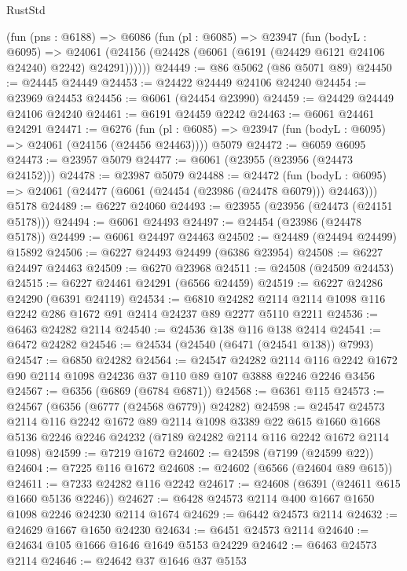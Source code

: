 \begin{lexlean}{RustStd}
\begin{coremodule}
    (fun (pns : @6188) =>
    @6086
      (fun (pl : @6085) =>
      @23947
        (fun (bodyL : @6095) =>
        @24061 (@24156 (@24428 (@6061 (@6191 (@24429 @6121 @24106 @24240) @2242) @24291))))))
@24449 := @86 @5062 (@86 @5071 @89)
@24450 := @24445 @24449
@24453 := @24422 @24449 @24106 @24240
@24454 := @23969 @24453
@24456 := @6061 (@24454 @23990)
@24459 := @24429 @24449 @24106 @24240
@24461 := @6191 @24459 @2242
@24463 := @6061 @24461 @24291
@24471 := @6276
    (fun (pl : @6085) => @23947 (fun (bodyL : @6095) => @24061 (@24156 (@24456 @24463))))
    @5079
@24472 := @6059 @6095
@24473 := @23957 @5079
@24477 := @6061 (@23955 (@23956 (@24473 @24152)))
@24478 := @23987 @5079
@24488 := @24472
    (fun (bodyL : @6095) => @24061 (@24477 (@6061 (@24454 (@23986 (@24478 @6079))) @24463)))
    @5178
@24489 := @6227 @24060
@24493 := @23955 (@23956 (@24473 (@24151 @5178)))
@24494 := @6061 @24493
@24497 := @24454 (@23986 (@24478 @5178))
@24499 := @6061 @24497 @24463
@24502 := @24489 (@24494 @24499) @15892
@24506 := @6227 @24493 @24499 (@6386 @23954)
@24508 := @6227 @24497 @24463
@24509 := @6270 @23968
@24511 := @24508 (@24509 @24453)
@24515 := @6227 @24461 @24291 (@6566 @24459)
@24519 := @6227 @24286 @24290 (@6391 @24119)
@24534 := @6810
    @24282
    @2114
    @2114
    @1098
    @116
    @2242
    @286
    @1672
    @91
    @2414
    @24237
    @89
    @2277
    @5110
    @2211
@24536 := @6463 @24282 @2114
@24540 := @24536 @138 @116 @138 @2414
@24541 := @6472 @24282
@24546 := @24534 (@24540 (@6471 (@24541 @138)) @7993)
@24547 := @6850 @24282
@24564 := @24547
    @24282
    @2114
    @116
    @2242
    @1672
    @90
    @2114
    @1098
    @24236
    @37
    @110
    @89
    @107
    @3888
    @2246
    @2246
    @3456
@24567 := @6356 (@6869 (@6784 @6871))
@24568 := @6361 @115
@24573 := @24567 (@6356 (@6777 (@24568 @6779)) @24282)
@24598 := @24547
    @24573
    @2114
    @116
    @2242
    @1672
    @89
    @2114
    @1098
    @3389
    @22
    @615
    @1660
    @1668
    @5136
    @2246
    @2246
    @24232
    (@7189 @24282 @2114 @116 @2242 @1672 @2114 @1098)
@24599 := @7219 @1672
@24602 := @24598 (@7199 (@24599 @22))
@24604 := @7225 @116 @1672
@24608 := @24602 (@6566 (@24604 @89 @615))
@24611 := @7233 @24282 @116 @2242
@24617 := @24608 (@6391 (@24611 @615 @1660 @5136 @2246))
@24627 := @6428 @24573 @2114 @400 @1667 @1650 @1098 @2246 @24230 @2114 @1674
@24629 := @6442 @24573 @2114
@24632 := @24629 @1667 @1650 @24230
@24634 := @6451 @24573 @2114
@24640 := @24634 @105 @1666 @1646 @1649 @5153 @24229
@24642 := @6463 @24573 @2114
@24646 := @24642 @37 @1646 @37 @5153

\end{coremodule}
\end{lexlean}
